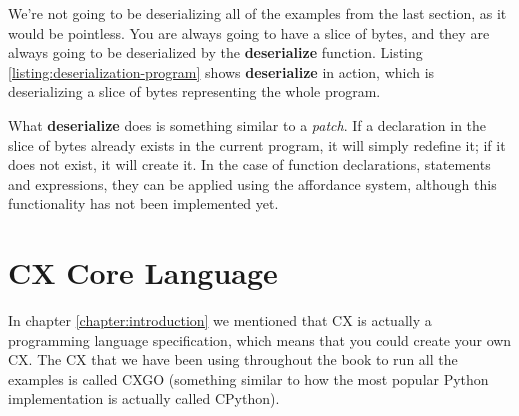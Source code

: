 \documentclass[11pt,fleqn,openany]{book} %
\begin{document}
We're not going to be deserializing all of the examples from the last section, as it would be pointless. You are always going to have a slice of bytes, and they are always going to be deserialized by the \textbf{deserialize} function. Listing \ref{listing:deserialization-program} shows \textbf{deserialize} in action, which is deserializing a slice of bytes representing the whole program.

What \textbf{deserialize} does is something similar to a \emph{patch}. If a declaration in the slice of bytes already exists in the current program, it will simply redefine it; if it does not exist, it will create it. In the case of function declarations, statements and expressions, they can be applied using the affordance system, although this functionality has not been implemented yet.


\chapter{CX Core Language}
\label{chapter:cx-core-language}


In chapter \ref{chapter:introduction} we mentioned that CX is actually a programming language specification, which means that you could create your own CX. The CX that we have been using throughout the book to run all the examples is called CXGO (something similar to how the most popular Python implementation is actually called CPython).
\end{document}
